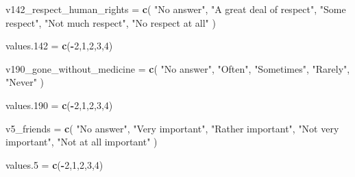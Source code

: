 \documentclass[
]{article}
\newenvironment{Shaded}{\begin{snugshade}}{\end{snugshade}}
\newcommand{\DecValTok}[1]{\textcolor[rgb]{0.00,0.00,0.81}{#1}}
\newcommand{\FloatTok}[1]{\textcolor[rgb]{0.00,0.00,0.81}{#1}}
\newcommand{\FunctionTok}[1]{\textcolor[rgb]{0.13,0.29,0.53}{\textbf{#1}}}
\newcommand{\NormalTok}[1]{#1}
\newcommand{\OtherTok}[1]{\textcolor[rgb]{0.56,0.35,0.01}{#1}}
\newcommand{\SpecialCharTok}[1]{\textcolor[rgb]{0.81,0.36,0.00}{\textbf{#1}}}
\newcommand{\StringTok}[1]{\textcolor[rgb]{0.31,0.60,0.02}{#1}}
\begin{document}
\begin{Shaded}
\begin{Highlighting}[]
\NormalTok{v142\_respect\_human\_rights }\OtherTok{=} \FunctionTok{c}\NormalTok{(}
\StringTok{"No answer"}\NormalTok{,}
\StringTok{"A great deal of respect"}\NormalTok{,}
\StringTok{"Some respect"}\NormalTok{,}
\StringTok{"Not much respect"}\NormalTok{,}
\StringTok{"No respect at all"}
\NormalTok{)}

\NormalTok{values}\FloatTok{.142} \OtherTok{=} \FunctionTok{c}\NormalTok{(}\SpecialCharTok{{-}}\DecValTok{2}\NormalTok{,}\DecValTok{1}\NormalTok{,}\DecValTok{2}\NormalTok{,}\DecValTok{3}\NormalTok{,}\DecValTok{4}\NormalTok{)}


\NormalTok{v190\_gone\_without\_medicine }\OtherTok{=} \FunctionTok{c}\NormalTok{(}
\StringTok{"No answer"}\NormalTok{,}
\StringTok{"Often"}\NormalTok{,}
\StringTok{"Sometimes"}\NormalTok{,}
\StringTok{"Rarely"}\NormalTok{,}
\StringTok{"Never"}
\NormalTok{)}

\NormalTok{values}\FloatTok{.190} \OtherTok{=} \FunctionTok{c}\NormalTok{(}\SpecialCharTok{{-}}\DecValTok{2}\NormalTok{,}\DecValTok{1}\NormalTok{,}\DecValTok{2}\NormalTok{,}\DecValTok{3}\NormalTok{,}\DecValTok{4}\NormalTok{)}

\NormalTok{v5\_friends }\OtherTok{=} \FunctionTok{c}\NormalTok{(}
\StringTok{"No answer"}\NormalTok{,}
\StringTok{"Very important"}\NormalTok{,}
\StringTok{"Rather important"}\NormalTok{,}
\StringTok{"Not very important"}\NormalTok{,}
\StringTok{"Not at all important"}
\NormalTok{)}

\NormalTok{values}\FloatTok{.5} \OtherTok{=} \FunctionTok{c}\NormalTok{(}\SpecialCharTok{{-}}\DecValTok{2}\NormalTok{,}\DecValTok{1}\NormalTok{,}\DecValTok{2}\NormalTok{,}\DecValTok{3}\NormalTok{,}\DecValTok{4}\NormalTok{)}
\end{Highlighting}
\end{Shaded}
\end{document}
